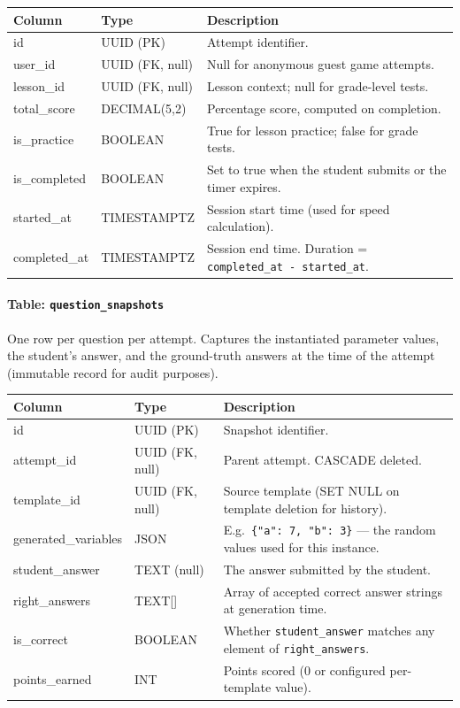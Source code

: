\begin{longtable}{|p{4.2cm}|p{3cm}|p{6.8cm}|}
\hline \textbf{Column} & \textbf{Type} & \textbf{Description} \\ \hline
id & UUID (PK) & Attempt identifier. \\ \hline
user\_id & UUID (FK, null) & Null for anonymous guest game attempts. \\ \hline
lesson\_id & UUID (FK, null) & Lesson context; null for grade-level tests. \\ \hline
total\_score & DECIMAL(5,2) & Percentage score, computed on completion. \\ \hline
is\_practice & BOOLEAN & True for lesson practice; false for grade tests. \\ \hline
is\_completed & BOOLEAN & Set to true when the student submits or the timer expires. \\ \hline
started\_at & TIMESTAMPTZ & Session start time (used for speed calculation). \\ \hline
completed\_at & TIMESTAMPTZ & Session end time. Duration = \texttt{completed\_at - started\_at}. \\ \hline
\end{longtable}

\paragraph{Table: \texttt{question\_snapshots}}
One row per question per attempt. Captures the instantiated parameter values, the student's answer, and the ground-truth answers at the time of the attempt (immutable record for audit purposes).

\begin{longtable}{|p{4.2cm}|p{3cm}|p{6.8cm}|}
\hline \textbf{Column} & \textbf{Type} & \textbf{Description} \\ \hline
id & UUID (PK) & Snapshot identifier. \\ \hline
attempt\_id & UUID (FK, null) & Parent attempt. CASCADE deleted. \\ \hline
template\_id & UUID (FK, null) & Source template (SET NULL on template deletion for history). \\ \hline
generated\_variables & JSON & E.g.\ \texttt{\{"a": 7, "b": 3\}} --- the random values used for this instance. \\ \hline
student\_answer & TEXT (null) & The answer submitted by the student. \\ \hline
right\_answers & TEXT[] & Array of accepted correct answer strings at generation time. \\ \hline
is\_correct & BOOLEAN & Whether \texttt{student\_answer} matches any element of \texttt{right\_answers}. \\ \hline
points\_earned & INT & Points scored (0 or configured per-template value). \\ \hline
\end{longtable}

